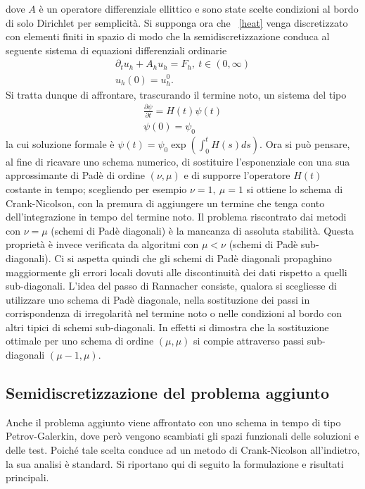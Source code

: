 dove $ A $ è un operatore differenziale ellittico e sono state scelte condizioni al bordo di solo Dirichlet per semplicità. Si supponga ora che ~\eqref{heat} venga discretizzato con elementi finiti in spazio di modo che la semidiscretizzazione conduca al seguente sistema di equazioni differenziali ordinarie
\begin{gather}
\label{heatsd}
\partial_t u_h + A_hu_h=F_h,\ t\in(0,\infty) \\
u_h(0)=u^0_h.
\end{gather}
Si tratta dunque di affrontare, trascurando il termine noto, un sistema del tipo
\begin{gather}
\label{pbmod}
\frac{\partial\psi}{\partial t}=H(t)\psi(t)  \\
\psi(0)=\psi_0
\end{gather}
la cui soluzione formale è $ \psi(t)=\psi_0\exp(\int^t_0 H(s)ds) $. Ora si può pensare, al fine di ricavare uno schema numerico, di sostituire l'esponenziale con una sua approssimante di Padè di ordine $ (\nu,\mu) $ e di supporre l'operatore $ H(t) $ costante in tempo; scegliendo per esempio $ \nu=1, \ \mu=1$ si ottiene lo schema di Crank-Nicolson, con la premura di aggiungere un termine che tenga conto dell'integrazione in tempo del termine noto. Il problema riscontrato dai metodi con $ \nu=\mu $ (schemi di Padè diagonali) è la mancanza di assoluta stabilità. Questa proprietà è invece verificata da algoritmi con $ \mu<\nu $ (schemi di Padè sub-diagonali). Ci si aspetta quindi che gli schemi di Padè diagonali propaghino maggiormente gli errori locali dovuti alle discontinuità dei dati rispetto a quelli sub-diagonali. 
L'idea del passo di Rannacher consiste, qualora si scegliesse di utilizzare uno schema di Padè diagonale, nella sostituzione dei passi in corrispondenza di irregolarità nel termine noto o nelle condizioni al bordo con altri tipici di schemi sub-diagonali. In effetti si dimostra che la sostituzione ottimale per uno schema di ordine $ (\mu,\mu) $ si compie attraverso passi sub-diagonali $ (\mu-1,\mu) $. 

\subsection{Semidiscretizzazione del problema aggiunto}
Anche il problema aggiunto viene affrontato con uno schema in tempo di tipo Petrov-Galerkin, dove però vengono scambiati gli spazi funzionali delle soluzioni e delle test. Poiché tale scelta conduce ad un metodo di Crank-Nicolson all'indietro, la sua analisi è standard. Si riportano qui di seguito la formulazione e risultati principali.

